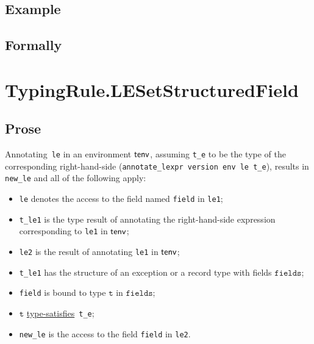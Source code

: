\documentclass{book}
\newcommand\typesatisfies[0]{\hyperlink{def-typesatisfies}{type-satisfies}}
\newcommand\vt[0]{\texttt{t}}
\newcommand\fields[0]{\texttt{fields}}
\begin{document}
  \subsection{Example}



\begin{emptyformal}
    \subsection{Formally}
\end{emptyformal}


\section{TypingRule.LESetStructuredField \label{sec:TypingRule.LESetStructuredField}}

    \subsection{Prose}
   Annotating~\texttt{le} in an environment $\textsf{tenv}$, assuming
\texttt{t\_e} to be the type of the corresponding right-hand-side
(\texttt{annotate\_lexpr version env le t\_e}), results in \texttt{new\_le} and
all of the following apply:
   \begin{itemize}
   \item \texttt{le} denotes the access to the field named \texttt{field} in \texttt{le1};
   \item \texttt{t\_le1} is the type result of annotating the right-hand-side expression corresponding to \texttt{le1} in $\textsf{tenv}$;
   \item \texttt{le2} is the result of annotating \texttt{le1} in $\textsf{tenv}$;
   \item \texttt{t\_le1} has the structure of an exception or a record type with fields $\fields$;
   \item \texttt{field} is bound to type $\vt$ in $\fields$;
   \item $\vt$ \typesatisfies\  \texttt{t\_e};
   \item \texttt{new\_le} is the access to the field \texttt{field} in \texttt{le2}.
   \end{itemize}
\end{document}

